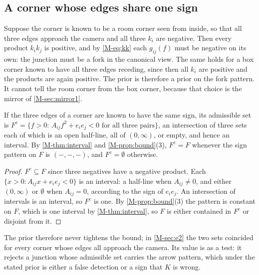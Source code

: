 
\subsection{A corner whose edges share one sign}\label{sec:concave}

Suppose the corner is known to be a room corner seen from inside, so that all three edges approach the camera and all three $k_i$ are negative. Then every product $k_ik_j$ is positive, and by \eqref{M-eq:kk} each $g_{ij}(f)$ must be negative on its own: the junction must be a fork in the canonical view. The same holds for a box corner known to have all three edges receding, since then all $k_i$ are positive and the products are again positive. The prior is therefore a prior on the fork pattern. It cannot tell the room corner from the box corner, because that choice is the mirror of \cref{M-sec:mirror1}.

\begin{proposition}\label{prop:concave}
If the three edges of a corner are known to have the same sign, its admissible set is $F^{c}=\{f>0:\,A_{ij}f^2+e_ie_j<0\text{ for all three pairs}\}$, an intersection of three sets each of which is an open half-line, all of $(0,\infty)$, or empty, and hence an interval. By \cref{M-thm:interval} and \cref{M-prop:bound}(3), $F^c=F$ whenever the sign pattern on $F$ is $(-,-,-)$, and $F^c=\emptyset$ otherwise.
\end{proposition}
\begin{proof}
$F^c\subseteq F$ since three negatives have a negative product. Each $\{x>0:A_{ij}x+e_ie_j<0\}$ is an interval: a half-line when $A_{ij}\neq0$, and either $(0,\infty)$ or $\emptyset$ when $A_{ij}=0$, according to the sign of $e_ie_j$. An intersection of intervals is an interval, so $F^c$ is one. By \cref{M-prop:bound}(3) the pattern is constant on $F$, which is one interval by \cref{M-thm:interval}, so $F$ is either contained in $F^c$ or disjoint from it.
\end{proof}

The prior therefore never tightens the bound; in \cref{M-sec:e2} the two sets coincided for every corner whose edges all approach the camera. Its value is as a test: it rejects a junction whose admissible set carries the arrow pattern, which under the stated prior is either a false detection or a sign that $K$ is wrong.


